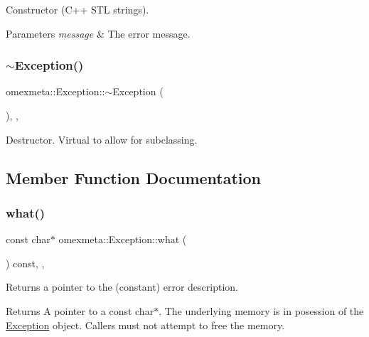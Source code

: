 Constructor (C++ S\+TL strings). 
\begin{DoxyParams}{Parameters}
{\em message} & The error message. \\
\hline
\end{DoxyParams}
\mbox{\label{classomexmeta_1_1Exception_aaa08b2467c40a3e28586c0da5da45736}} 
\subsubsection{\texorpdfstring{$\sim$\+Exception()}{~Exception()}}
{\footnotesize\ttfamily omexmeta\+::\+Exception\+::$\sim$\+Exception (\begin{DoxyParamCaption}{ }\end{DoxyParamCaption})\hspace{0.3cm}{\ttfamily [override]}, {\ttfamily [default]}, {\ttfamily [noexcept]}}

Destructor. Virtual to allow for subclassing. 

\subsection{Member Function Documentation}
\mbox{\label{classomexmeta_1_1Exception_af9c3f258e4715dd2102f5c2db5fbe260}} 
\subsubsection{\texorpdfstring{what()}{what()}}
{\footnotesize\ttfamily const char$\ast$ omexmeta\+::\+Exception\+::what (\begin{DoxyParamCaption}{ }\end{DoxyParamCaption}) const\hspace{0.3cm}{\ttfamily [inline]}, {\ttfamily [override]}, {\ttfamily [noexcept]}}

Returns a pointer to the (constant) error description. \begin{DoxyReturn}{Returns}
A pointer to a const char$\ast$. The underlying memory is in posession of the \hyperlink{classomexmeta_1_1Exception}{Exception} object. Callers must not attempt to free the memory. 
\end{DoxyReturn}


